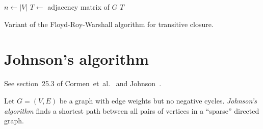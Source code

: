 \begin{algorithm}[!htpb]
\dontprintsemicolon  %
\BlankLine
$n \leftarrow |V|$\;
$T \leftarrow$ adjacency matrix of $G$\;
\Return $T$\;
\caption{Variant of the Floyd-Roy-Warshall algorithm for transitive closure.}
\label{alg:graph_algorithms:Floy_Roy_Warshall:transitive_closure}
\end{algorithm}



\section{Johnson's algorithm}

See section~25.3 of Cormen~et~al.~\cite{CormenEtAl2001} and
Johnson~\cite{Johnson1977}.

Let $G = (V,E)$ be a graph with edge weights but no negative cycles.
\emph{Johnson's algorithm} finds a shortest path between all pairs of
vertices in a ``sparse'' directed graph.

